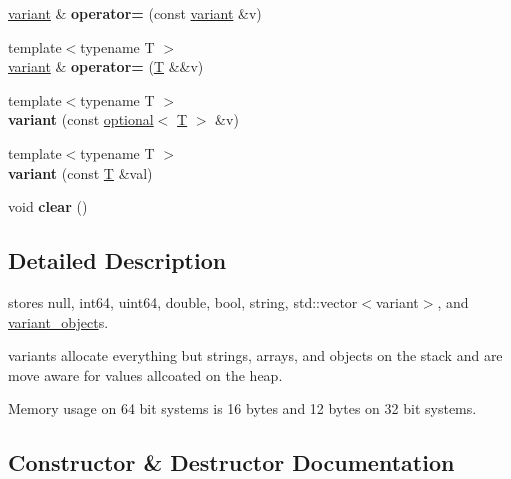 \begin{DoxyCompactItemize}
\item 
\mbox{\label{classfc_1_1variant_af0367a0aa45efe02b3db8e17ce94e43e}} 
\mbox{\hyperlink{classfc_1_1variant}{variant}} \& {\bfseries operator=} (const \mbox{\hyperlink{classfc_1_1variant}{variant}} \&v)
\item 
\mbox{\label{classfc_1_1variant_aec8b90765a89a37567b4b50aa0f61928}} 
{\footnotesize template$<$typename T $>$ }\\\mbox{\hyperlink{classfc_1_1variant}{variant}} \& {\bfseries operator=} (\mbox{\hyperlink{struct_t}{T}} \&\&v)
\item 
\mbox{\label{classfc_1_1variant_a32a8721d020e95b4f6a838e9dc8e99a9}} 
{\footnotesize template$<$typename T $>$ }\\{\bfseries variant} (const \mbox{\hyperlink{classfc_1_1optional}{optional}}$<$ \mbox{\hyperlink{struct_t}{T}} $>$ \&v)
\item 
\mbox{\label{classfc_1_1variant_a9c0d8a975fbe4a35be95976ba3d457e1}} 
{\footnotesize template$<$typename T $>$ }\\{\bfseries variant} (const \mbox{\hyperlink{struct_t}{T}} \&val)
\item 
\mbox{\label{classfc_1_1variant_a201c1ea686618f06d5839e541da3d641}} 
void {\bfseries clear} ()
\end{DoxyCompactItemize}


\subsection{Detailed Description}
stores null, int64, uint64, double, bool, string, std\+::vector$<$variant$>$, and \mbox{\hyperlink{classfc_1_1variant__object}{variant\+\_\+object}}\textquotesingle{}s. 

variant\textquotesingle{}s allocate everything but strings, arrays, and objects on the stack and are \textquotesingle{}move aware\textquotesingle{} for values allcoated on the heap.

Memory usage on 64 bit systems is 16 bytes and 12 bytes on 32 bit systems. 

\subsection{Constructor \& Destructor Documentation}
\mbox{\label{classfc_1_1variant_a045c86b5101d4e46e30c03dcb2ce9794}} 
